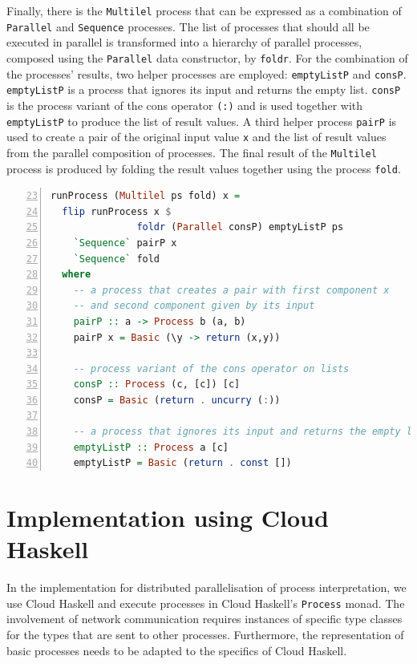 Finally, there is the \texttt{Multilel} process that can be expressed as a combination of \texttt{Parallel} and \texttt{Sequence} processes. The list of processes that should all be executed in parallel is transformed into a hierarchy of parallel processes, composed using the \texttt{Parallel} data constructor, by \texttt{foldr}. For the combination of the processes' results, two helper processes are employed: \texttt{emptyListP} and \texttt{consP}. \texttt{emptyListP} is a process that ignores its input and returns the empty list. \texttt{consP} is the process variant of the cons operator \texttt{(:)} and is used together with \texttt{emptyListP} to produce the list of result values. A third helper process \texttt{pairP} is used to create a pair of the original input value \texttt{x} and the list of result values from the parallel composition of processes. The final result of the \texttt{Multilel} process is produced by folding the result values together using the process \texttt{fold}.
\begin{lstlisting}[language=Haskell,caption=Implementation of the interpreter for \texttt{Multilel} processes.,label=lst:local_runprocess_multilel,numbers=left,frame=bt,firstnumber=23]
runProcess (Multilel ps fold) x =
  flip runProcess x $
               foldr (Parallel consP) emptyListP ps 
    `Sequence` pairP x
    `Sequence` fold
  where
    -- a process that creates a pair with first component x
    -- and second component given by its input
    pairP :: a -> Process b (a, b)
    pairP x = Basic (\y -> return (x,y))
 
    -- process variant of the cons operator on lists
    consP :: Process (c, [c]) [c]
    consP = Basic (return . uncurry (:))

    -- a process that ignores its input and returns the empty list
    emptyListP :: Process a [c]
    emptyListP = Basic (return . const [])
\end{lstlisting}


\clearpage

\section{Implementation using Cloud Haskell}
\label{chp:distributed}
In the implementation for distributed parallelisation of process interpretation, we use \textsf{Cloud Haskell} and execute processes in \textsf{Cloud Haskell}'s \texttt{Process} monad. The involvement of network communication requires instances of specific type classes for the types that are sent to other processes. Furthermore, the representation of basic processes needs to be adapted to the specifics of \textsf{Cloud Haskell}. 


